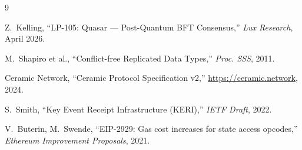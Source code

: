 \documentclass[11pt,a4paper]{article}
\begin{document}

\begin{thebibliography}{9}

Z.~Kelling, ``LP-105: Quasar --- Post-Quantum BFT Consensus,''
\textit{Lux Research}, April 2026.

M.~Shapiro et al., ``Conflict-free Replicated Data Types,''
\textit{Proc. SSS}, 2011.

Ceramic Network, ``Ceramic Protocol Specification v2,''
\url{https://ceramic.network}, 2024.

S.~Smith, ``Key Event Receipt Infrastructure (KERI),''
\textit{IETF Draft}, 2022.

V.~Buterin, M.~Swende, ``EIP-2929: Gas cost increases for state access opcodes,''
\textit{Ethereum Improvement Proposals}, 2021.

\end{thebibliography}
\end{document}
